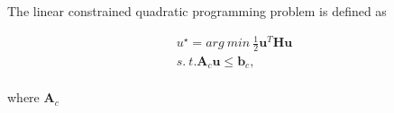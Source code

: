 The linear constrained quadratic programming problem is defined as 



\begin{equation}
\begin{split}
u^\star = arg\ min\ \frac{1}{2} \textbf{u}^T \textbf{Hu}\\
s.\ t. \textbf{A}_c \textbf{u}\leq \textbf{b}_c,\\
\end{split}
\label{eq:quadprog_constrained_definition}
\end{equation}

where $\textbf{A}_c$



